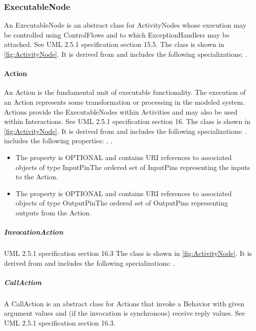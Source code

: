 \subsubsection{ExecutableNode}%
\label{sec:uml:ExecutableNode}%
An ExecutableNode is an abstract class for ActivityNodes whose execution may be controlled using ControlFlows and to which ExceptionHandlers may be attached. See UML 2.5.1 specification section 15.5.%
\linebreak%
\linebreak%
The  class is shown in \ref{fig:ActivityNode}. It is derived from  and includes the following specializations: . %
%
\paragraph{Action}%
\label{sec:uml:Action}%
An Action is the fundamental unit of executable functionality. The execution of an Action represents some transformation or processing in the modeled system. Actions provide the ExecutableNodes within Activities and may also be used within Interactions. See UML 2.5.1 specification section 16.%
\linebreak%
\linebreak%
The  class is shown in \ref{fig:ActivityNode}. It is derived from  and includes the following specializations: . %
 includes the following properties: , . %
\begin{itemize}%
\item%
The  property is OPTIONAL and contains URI references to associated objects of type InputPinThe ordered set of InputPins representing the inputs to the Action.%
\item%
The  property is OPTIONAL and contains URI references to associated objects of type OutputPinThe ordered set of OutputPins representing outputs from the Action.%
\end{itemize}%
\subparagraph{InvocationAction}%
\label{sec:uml:InvocationAction}%
UML 2.5.1 specification section 16.3%
\linebreak%
\linebreak%
The  class is shown in \ref{fig:ActivityNode}. It is derived from  and includes the following specializations: . %
%
\subparagraph{CallAction}%
\label{sec:uml:CallAction}%
A CallAction is an abstract class for Actions that invoke a Behavior with given argument values and (if the invocation is synchronous) receive reply values. See UML 2.5.1 specification section 16.3.%
